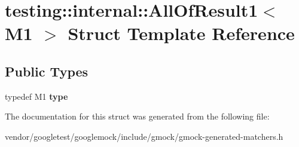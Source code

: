 \hypertarget{structtesting_1_1internal_1_1AllOfResult1}{}\section{testing\+:\+:internal\+:\+:All\+Of\+Result1$<$ M1 $>$ Struct Template Reference}
\label{structtesting_1_1internal_1_1AllOfResult1}
\subsection*{Public Types}
\begin{DoxyCompactItemize}
\item 
typedef M1 {\bfseries type}\hypertarget{structtesting_1_1internal_1_1AllOfResult1_a19b95d4ddf7f4044a78665d9e253db10}{}\label{structtesting_1_1internal_1_1AllOfResult1_a19b95d4ddf7f4044a78665d9e253db10}

\end{DoxyCompactItemize}


The documentation for this struct was generated from the following file\+:\begin{DoxyCompactItemize}
\item 
vendor/googletest/googlemock/include/gmock/gmock-\/generated-\/matchers.\+h\end{DoxyCompactItemize}
